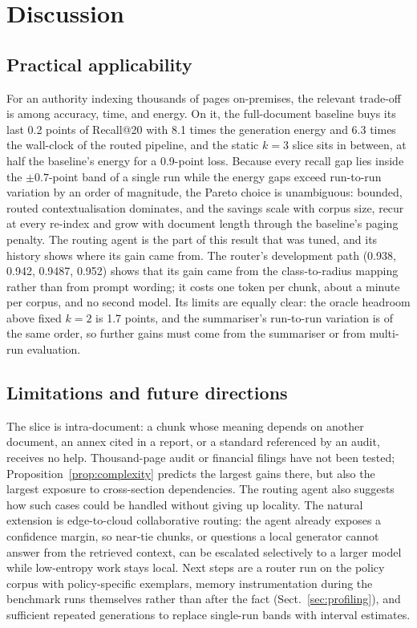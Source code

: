 \documentclass[pdflatex,sn-mathphys-num]{sn-jnl}
\makeatletter
\newcommand{\Rec}[1]{Recall@#1}
\theoremstyle{thmstyleone}%
\theoremstyle{thmstylethree}%
\makeatother
\begin{document}
\section{Discussion}\label{sec:discussion}

\subsection{Practical applicability}
For an authority indexing thousands of pages on-premises, the relevant trade-off is among accuracy, time, and energy. On it, the full-document baseline buys its last 0.2 points of \Rec{20} with 8.1 times the generation energy and 6.3 times the wall-clock of the routed pipeline, and the static $k=3$ slice sits in between, at half the baseline's energy for a 0.9-point loss. Because every recall gap lies inside the $\pm0.7$-point band of a single run while the energy gaps exceed run-to-run variation by an order of magnitude, the Pareto choice is unambiguous: bounded, routed contextualisation dominates, and the savings scale with corpus size, recur at every re-index and grow with document length through the baseline's paging penalty. The routing agent is the part of this result that was tuned, and its history shows where its gain came from. The router's development path (0.938, 0.942, 0.9487, 0.952) shows that its gain came from the class-to-radius mapping rather than from prompt wording; it costs one token per chunk, about a minute per corpus, and no second model. Its limits are equally clear: the oracle headroom above fixed $k=2$ is 1.7 points, and the summariser's run-to-run variation is of the same order, so further gains must come from the summariser or from multi-run evaluation.

\subsection{Limitations and future directions}
The slice is intra-document: a chunk whose meaning depends on another document, an annex cited in a report, or a standard referenced by an audit, receives no help. Thousand-page audit or financial filings have not been tested; Proposition~\ref{prop:complexity} predicts the largest gains there, but also the largest exposure to cross-section dependencies. The routing agent also suggests how such cases could be handled without giving up locality. The natural extension is edge-to-cloud collaborative routing: the agent already exposes a confidence margin, so near-tie chunks, or questions a local generator cannot answer from the retrieved context, can be escalated selectively to a larger model while low-entropy work stays local. Next steps are a router run on the policy corpus with policy-specific exemplars, memory instrumentation during the benchmark runs themselves rather than after the fact (Sect.~\ref{sec:profiling}), and sufficient repeated generations to replace single-run bands with interval estimates.
\end{document}
